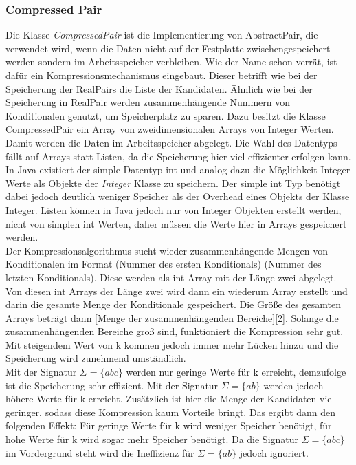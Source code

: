 \documentclass[12pt,a4paper]{article}
\begin{document}
\subsubsection{Compressed Pair}
Die Klasse  \textit{CompressedPair} ist die Implementierung von AbstractPair, die verwendet wird, wenn die Daten nicht auf der Festplatte zwischengespeichert werden sondern im Arbeitsspeicher verbleiben. Wie der Name schon verrät, ist dafür ein Kompressionsmechanismus eingebaut. Dieser betrifft wie bei der Speicherung der RealPairs die Liste der Kandidaten. Ähnlich wie bei der Speicherung in RealPair werden zusammenhängende Nummern von Konditionalen genutzt, um Speicherplatz zu sparen. Dazu besitzt die Klasse CompressedPair ein Array von zweidimensionalen Arrays von Integer Werten. Damit werden die Daten im Arbeitsspeicher abgelegt. Die Wahl des Datentyps fällt auf Arrays statt Listen, da die Speicherung hier viel effizienter erfolgen kann. In Java existiert der simple Datentyp int und analog dazu die Möglichkeit Integer Werte als Objekte der \textit{Integer} Klasse zu speichern. Der simple int Typ benötigt dabei jedoch deutlich weniger Speicher als der Overhead eines Objekts der Klasse Integer. Listen können in Java jedoch nur von Integer Objekten erstellt werden, nicht von simplen int Werten, daher müssen die Werte hier in Arrays gespeichert werden.\\
Der Kompressionsalgorithmus sucht wieder zusammenhängende Mengen von Konditionalen im Format (Nummer des ersten Konditionals) (Nummer des letzten Konditionals). Diese werden als int Array mit der Länge zwei abgelegt. Von diesen int Arrays der Länge zwei wird dann ein wiederum Array erstellt und darin die gesamte Menge der Konditionale gespeichert. Die Größe des gesamten Arrays beträgt dann [Menge der zusammenhängenden Bereiche][2]. Solange die zusammenhängenden Bereiche groß sind, funktioniert die Kompression sehr gut. Mit steigendem Wert von k kommen jedoch immer mehr Lücken hinzu und die Speicherung wird zunehmend umständlich. \\
Mit der Signatur $\Sigma=\{abc\}$ werden nur geringe Werte für k erreicht, demzufolge ist die Speicherung sehr effizient. Mit der Signatur $\Sigma=\{ab\}$ werden jedoch höhere Werte für k erreicht. Zusätzlich ist hier die Menge der Kandidaten viel geringer, sodass diese Kompression kaum Vorteile bringt. Das ergibt dann den folgenden Effekt: Für geringe Werte für k wird weniger Speicher benötigt, für hohe Werte für k wird sogar mehr Speicher benötigt. Da die Signatur  $\Sigma=\{abc\}$ im Vordergrund steht wird die Ineffizienz für $\Sigma=\{ab\}$  jedoch ignoriert.\\
\end{document}
